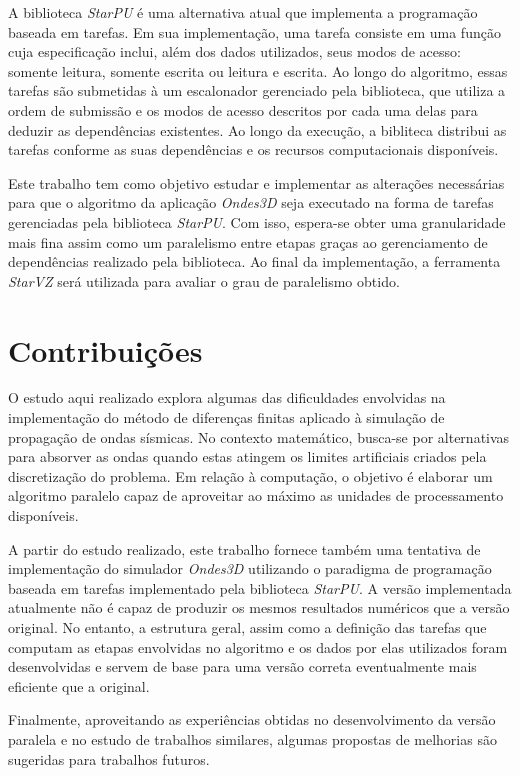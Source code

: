 \documentclass[cic,tc]{iiufrgs}
\begin{document}
A biblioteca \textit{StarPU} é uma alternativa atual que implementa a programação baseada em tarefas. Em sua implementação, uma tarefa consiste em uma função cuja especificação
inclui, além dos dados utilizados, seus modos de acesso: somente leitura, somente escrita ou leitura e escrita. Ao longo do algoritmo, essas tarefas são submetidas à um escalonador
gerenciado pela biblioteca, que utiliza a ordem de submissão e os modos de acesso descritos por cada uma delas para deduzir as dependências existentes. Ao longo da execução, a bibliteca
distribui as tarefas conforme as suas dependências e os recursos computacionais disponíveis.

Este trabalho tem como objetivo estudar e implementar as alterações necessárias para que o algoritmo da aplicação \textit{Ondes3D} seja executado na forma de tarefas gerenciadas
pela biblioteca \textit{StarPU}. Com isso, espera-se obter uma granularidade mais fina assim como um paralelismo entre etapas graças ao gerenciamento de dependências realizado pela biblioteca.
Ao final da implementação, a ferramenta \textit{StarVZ} será utilizada para avaliar o grau de paralelismo obtido.


\section{Contribuições}

O estudo aqui realizado explora algumas das dificuldades envolvidas na implementação do método de diferenças finitas aplicado à simulação de propagação de ondas sísmicas. No contexto matemático,
busca-se por alternativas para absorver as ondas quando estas atingem os limites artificiais criados pela discretização do problema. Em relação à computação, o objetivo é elaborar um algoritmo
paralelo capaz de aproveitar ao máximo as unidades de processamento disponíveis.

A partir do estudo realizado, este trabalho fornece também uma tentativa de implementação do simulador \textit{Ondes3D} utilizando o paradigma de programação baseada em tarefas implementado
pela biblioteca \textit{StarPU}. A versão implementada atualmente não é capaz de produzir os mesmos resultados numéricos que a versão original. No entanto,  a estrutura geral, assim como
a definição das tarefas que computam as etapas envolvidas no algoritmo e os dados por elas utilizados foram desenvolvidas e servem de base para uma versão correta eventualmente mais
eficiente que a original.

Finalmente, aproveitando as experiências obtidas no desenvolvimento da versão paralela e no estudo de trabalhos similares, algumas propostas de melhorias são sugeridas para trabalhos futuros.
\end{document}
